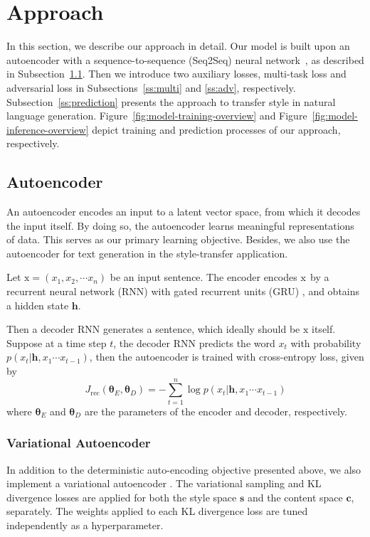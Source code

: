\documentclass[11pt,a4paper]{article}
\newcommand{\rmx}{\mathrm x} %
\newcommand{\loss}[1]{J_\text{#1}}
\begin{document}
\section{Approach}

In this section, we describe our approach in detail. Our model is built upon an autoencoder with a sequence-to-sequence (Seq2Seq) neural network~\cite{sutskever2014sequence}, as described in Subsection~\ref{ss:seq2seq}. Then we introduce two auxiliary losses, multi-task loss and adversarial loss in Subsections~\ref{ss:multi} and \ref{ss:adv}, respectively. Subsection~\ref{ss:prediction} presents the approach to transfer style in natural language generation. Figure~\ref{fig:model-training-overview} and Figure~\ref{fig:model-inference-overview} depict training and prediction processes of our approach, respectively.


\subsection{Autoencoder} \label{ss:seq2seq}

An autoencoder encodes an input to a latent vector space, from which it decodes the input itself. By doing so, the autoencoder learns meaningful representations of data. This serves as our primary learning objective. Besides, we also use the autoencoder for text generation in the style-transfer application.

Let $\rmx=(x_1, x_2, \cdots x_n)$ be an input sentence. The encoder encodes $\rm x$ by a recurrent neural network (RNN) with gated recurrent units (GRU) \cite{cho2014learning}, and obtains a hidden state $\bm h$.

Then a decoder RNN generates a sentence, which ideally should be $\rmx$ itself. Suppose at a time step $t$, the decoder RNN predicts the word $x_t$ with probability $p(x_t|\bm h, x_1\cdots x_{t-1})$, then the autoencoder is trained with cross-entropy loss, given by
\begin{equation}
	\loss{rec}(\bm\theta_E,\bm\theta_D)= -\sum_{t=1}^n \log p(x_t|\bm h, x_1\cdots x_{t-1})
\end{equation}
where $\bm\theta_E$ and $\bm\theta_D$ are the parameters of the encoder and decoder, respectively.

\subsubsection{Variational Autoencoder}

In addition to the deterministic auto-encoding objective presented above, we also implement a variational autoencoder \cite{kingma2013auto}. The variational sampling and KL divergence losses are applied for both the style space $\bm s$ and the content space $\bm c$, separately. The weights applied to each KL divergence loss are tuned independently as a hyperparameter.
\end{document}
